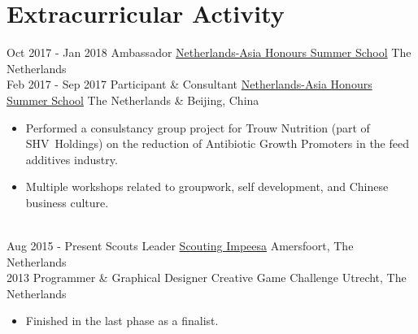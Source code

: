 \documentclass[letterpaper]{twentysecondcv} %
\begin{document}
\section{Extracurricular Activity}
\begin{twenty} %
	\twentyitem
	{Oct 2017 -}
	{Jan 2018}
	{Ambassador}
	{\href{https://nahss.nl}{Netherlands-Asia Honours Summer School}}
	{The Netherlands}
	{}
	\\
	\twentyitem
	{Feb 2017 -}
	{Sep 2017}
	{Participant \& Consultant}
	{\href{https://nahss.nl}{Netherlands-Asia Honours Summer School}}
	{The Netherlands \& Beijing, China}
	{
		\begin{itemize}
			\item Performed a consulstancy group project for Trouw Nutrition (part of SHV~Holdings) on the reduction of Antibiotic Growth Promoters in the feed additives industry.
			\item Multiple workshops related to groupwork, self development, and Chinese business culture.
		\end{itemize}
	}
	\\
	\twentyitem
	{Aug 2015 -}
	{Present}
	{Scouts Leader}
	{\href{http://impeesa.nl/}{Scouting Impeesa}}
	{Amersfoort, The Netherlands}
	{}
	\\
	\twentyitem
	{2013}
	{}
	{Programmer \& Graphical Designer}
	{Creative Game Challenge}
	{Utrecht, The Netherlands}
	{
		\begin{itemize}
			\item Finished in the last phase as a finalist.
		\end{itemize}
	}
\end{twenty}
\end{document}
